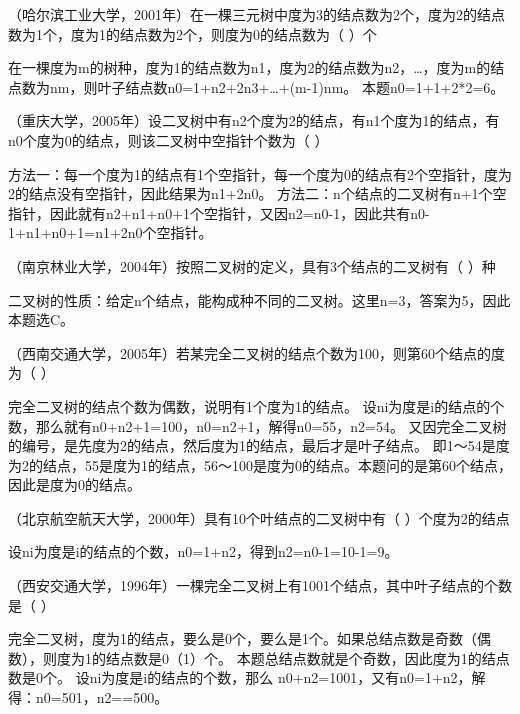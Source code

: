 \question （哈尔滨工业大学，2001年）在一棵三元树中度为3的结点数为2个，度为2的结点数为1个，度为1的结点数为2个，则度为0的结点数为（
）个
\par{}
\begin{solution}在一棵度为m的树种，度为1的结点数为n1，度为2的结点数为n2，\ldots{}，度为m的结点数为nm，则叶子结点数n0=1+n2+2n3+\ldots{}+(m-1)nm。
本题n0=1+1+2*2=6。
\end{solution}
\question （重庆大学，2005年）设二叉树中有n2个度为2的结点，有n1个度为1的结点，有n0个度为0的结点，则该二叉树中空指针个数为（
）
\par{}
\begin{solution}方法一：每一个度为1的结点有1个空指针，每一个度为0的结点有2个空指针，度为2的结点没有空指针，因此结果为n1+2n0。
方法二：n个结点的二叉树有n+1个空指针，因此就有n2+n1+n0+1个空指针，又因n2=n0-1，因此共有n0-1+n1+n0+1=n1+2n0个空指针。
\end{solution}
\question （南京林业大学，2004年）按照二叉树的定义，具有3个结点的二叉树有（ ）种
\par{}
\begin{solution}二叉树的性质：给定n个结点，能构成种不同的二叉树。这里n=3，答案为5，因此本题选C。
\end{solution}
\question （西南交通大学，2005年）若某完全二叉树的结点个数为100，则第60个结点的度为（
）
\par{}
\begin{solution}完全二叉树的结点个数为偶数，说明有1个度为1的结点。
设ni为度是i的结点的个数，那么就有n0+n2+1=100，n0=n2+1，解得n0=55，n2=54。
又因完全二叉树的编号，是先度为2的结点，然后度为1的结点，最后才是叶子结点。
即1～54是度为2的结点，55是度为1的结点，56～100是度为0的结点。本题问的是第60个结点，因此是度为0的结点。
\end{solution}
\question （北京航空航天大学，2000年）具有10个叶结点的二叉树中有（ ）个度为2的结点
\par{}
\begin{solution}设ni为度是i的结点的个数，n0=1+n2，得到n2=n0-1=10-1=9。
\end{solution}
\question （西安交通大学，1996年）一棵完全二叉树上有1001个结点，其中叶子结点的个数是（
）
\par{}
\begin{solution}完全二叉树，度为1的结点，要么是0个，要么是1个。如果总结点数是奇数（偶数），则度为1的结点数是0（1）个。
本题总结点数就是个奇数，因此度为1的结点数是0个。
设ni为度是i的结点的个数，那么
n0+n2=1001，又有n0=1+n2，解得：n0=501，n2==500。
\end{solution}
